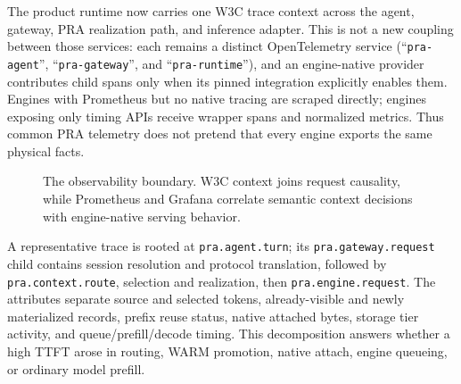 \documentclass[11pt]{article}
\begin{document}
The product runtime now carries one W3C trace context across the agent,
gateway, PRA realization path, and inference adapter.  This is not a new
coupling between those services: each remains a distinct OpenTelemetry service
(``\texttt{pra-agent}'', ``\texttt{pra-gateway}'', and
``\texttt{pra-runtime}''), and an engine-native provider contributes child
spans only when its pinned integration explicitly enables them.  Engines with
Prometheus but no native tracing are scraped directly; engines exposing only
timing APIs receive wrapper spans and normalized metrics.  Thus common PRA
telemetry does not pretend that every engine exports the same physical facts.

\begin{figure}[H]
\centering
{}
\caption{The observability boundary.  W3C context joins request causality,
while Prometheus and Grafana correlate semantic context decisions with
engine-native serving behavior.}
\label{fig:observability-architecture}
\end{figure}

A representative trace is rooted at \texttt{pra.agent.turn}; its
\texttt{pra.gateway.request} child contains session resolution and protocol
translation, followed by \texttt{pra.context.route}, selection and realization,
then \texttt{pra.engine.request}.  The attributes separate source and selected
tokens, already-visible and newly materialized records, prefix reuse status,
native attached bytes, storage tier activity, and queue/prefill/decode timing.
This decomposition answers whether a high TTFT arose in routing, WARM
promotion, native attach, engine queueing, or ordinary model prefill.
\end{document}
